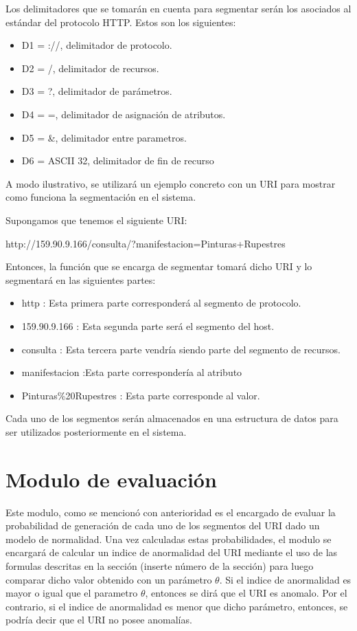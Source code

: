 Los delimitadores que se tomarán en cuenta para segmentar serán los asociados al estándar del protocolo HTTP. Estos son los siguientes:

\begin{itemize}
\item D1 = ://, delimitador de protocolo.
\item D2 = /, delimitador de recursos.
\item D3 = ?, delimitador de parámetros.
\item D4 = =, delimitador de asignación de atributos.
\item D5 = \&, delimitador entre parametros.
\item D6 = ASCII 32, delimitador de fin de recurso
\end{itemize}

A modo ilustrativo, se utilizará un ejemplo concreto con un URI para mostrar como funciona la segmentación en el sistema.

Supongamos que tenemos el siguiente URI:

http://159.90.9.166/consulta/?manifestacion=Pinturas+Rupestres

Entonces, la función que se encarga de segmentar tomará dicho URI y lo segmentará en las siguientes partes:

\begin{itemize}
\item http : Esta primera parte corresponderá al segmento de protocolo. 
\item 159.90.9.166 : Esta segunda parte será el segmento del host. 
\item consulta : Esta tercera parte vendría siendo parte del segmento de recursos.
\item manifestacion :Esta parte correspondería al atributo
\item Pinturas\%20Rupestres : Esta parte corresponde al valor.  
\end{itemize}

Cada uno de los segmentos serán almacenados en una estructura de datos para ser utilizados posteriormente en el sistema.

\section{Modulo de evaluación}
\label{sec:evaluacion}

Este modulo, como se mencionó con anterioridad es el encargado de evaluar la probabilidad de generación de cada uno de los segmentos del URI dado un modelo de normalidad. Una vez calculadas estas probabilidades, el modulo se encargará de calcular un indice de anormalidad del URI mediante el uso de las formulas descritas en la sección (inserte número de la sección) para luego comparar dicho valor obtenido con un parámetro $\theta$. Si el indice de anormalidad es mayor o igual que el parametro $\theta$, entonces se dirá que el URI es anomalo. Por el contrario, si el indice de anormalidad es menor que dicho parámetro, entonces, se podría decir que el URI no posee anomalías.

